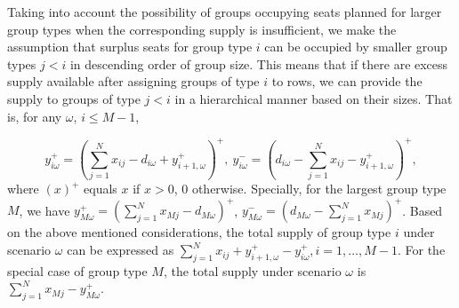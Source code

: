 Taking into account the possibility of groups occupying seats planned for larger group types when the corresponding supply is insufficient, we make the assumption that surplus seats for group type $i$ can be occupied by smaller group types $j<i$ in descending order of group size. This means that if there are excess supply available after assigning groups of type $i$ to rows, we can provide the supply to groups of type $j<i$ in a hierarchical manner based on their sizes. That is, for any $\omega$, $i \leq M-1$, 

$$y_{i \omega}^{+}=\left(\sum_{j=1}^N x_{ij}- d_{i \omega} + y_{i+1, \omega}^{+}\right)^{+}, ~y_{i \omega}^{-}=\left(d_{i \omega}- \sum_{j=1}^N x_{ij} - y_{i+1, \omega}^{+} \right)^{+},$$
where $(x)^{+}$ equals $x$ if $x>0$, $0$ otherwise. Specially, for the largest group type $M$, we have $y_{M \omega}^{+} = (\sum_{j=1}^N x_{Mj} - d_{M \omega})^{+}$, $y_{M \omega}^{-} = (d_{M \omega}- \sum_{j=1}^N x_{Mj})^{+}$. Based on the above mentioned considerations, the total supply of group type $i$ under scenario $\omega$ can be expressed as $\sum_{j= 1}^{N} x_{ij} + y_{i+1,\omega}^{+} - y_{i \omega}^{+}, i = 1, \ldots, M-1$. For the special case of group type $M$, the total supply under scenario $\omega$ is $\sum_{j= 1}^{N} x_{Mj} - y_{M \omega}^{+}$.






